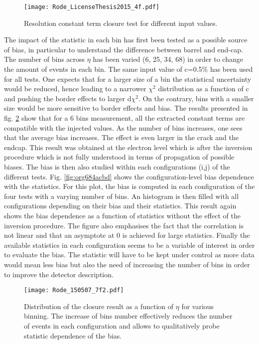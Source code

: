 \begin{enumerate}
\begin{figure}[htbp]
\centering
\texttt{[image: Rode\_LicenseThesis2015\_4f.pdf]}
\caption{\label{fig:orge546668}
Resolution constant term closure test for different input values.\cite{Rode2015}}
\end{figure}

The impact of the statistic in each bin has first been tested as a possible source of bias, in particular to understand the difference between barrel and end-cap.
The number of bins across $\eta$ has been varied (6, 25, 34, 68) in order to change the amount of events in each bin.
The same input value of c=0.5\% has been used for all tests.
One expects that for a larger size of a bin the statistical uncertainty would be reduced, hence leading to a narrower $\chi^2$ distribution as a function of c and pushing the border effects to larger d$\chi^2$.
On the contrary, bins with a smaller size would be more sensitive to border effects and bias.
The results presented in fig.  \ref{fig:org827d3c0} show that for a 6 bins measurement, all the extracted constant terms are compatible with the injected values.
As the number of bins increases, one sees that the average bias increases.
The effect is even larger in the crack and the endcap.
This result was obtained at the electron level which is after the inversion procedure which is not fully understood in terms of propagation of possible biases.
The bias is then also studied within each configurations (i,j) of the different tests.
Fig. \ref{fig:org684acbd} shows the configuration-level bias dependence with the statistics.
For this plot, the bias is computed in each configuration of the four tests with a varying number of bins.
An histogram is then filled with all configurations depending on their bias and their statistics.
This result again shows the bias dependence as a function of statistics without the effect of the inversion procedure.
The figure also emphasises the fact that the correlation is not linear and that an asymptote at 0 is achieved for large statistics.
Finally the available statistics in each configuration seems to be a variable of interest in order to evaluate the bias.
The statistic will have to be kept under control as more data would mean less bias but also the need of increasing the number of bins in order to improve the detector description.

\begin{figure}[htbp]
\centering
\texttt{[image: Rode\_150507\_7f2.pdf]}
\caption{\label{fig:org827d3c0}
Distribution of the closure result as a function of $\eta$ for various binning. The increase of bins number effectively reduces the number of events in each configuration and allows to qualitatively probe statistic dependence of the bias. \cite{Rode2015}}
\end{figure}


\end{enumerate}
